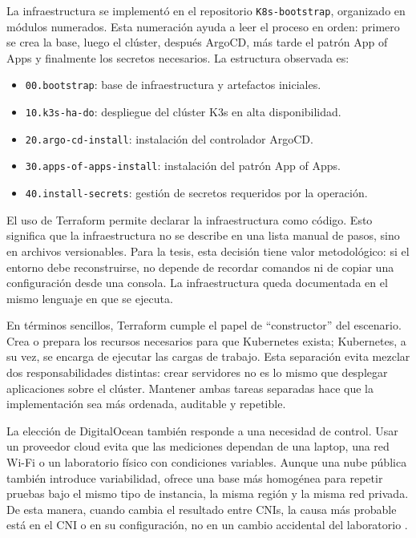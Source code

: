 \documentclass[journal]{IEEEtran}
\begin{document}
La infraestructura se implementó en el repositorio \texttt{K8s-bootstrap}, organizado en módulos numerados. Esta numeración ayuda a leer el proceso en orden: primero se crea la base, luego el clúster, después ArgoCD, más tarde el patrón App of Apps y finalmente los secretos necesarios. La estructura observada es:

\begin{itemize}
\item \texttt{00.bootstrap}: base de infraestructura y artefactos iniciales.
\item \texttt{10.k3s-ha-do}: despliegue del clúster K3s en alta disponibilidad.
\item \texttt{20.argo-cd-install}: instalación del controlador ArgoCD.
\item \texttt{30.apps-of-apps-install}: instalación del patrón App of Apps.
\item \texttt{40.install-secrets}: gestión de secretos requeridos por la operación.
\end{itemize}

El uso de Terraform permite declarar la infraestructura como código. Esto significa que la infraestructura no se describe en una lista manual de pasos, sino en archivos versionables. Para la tesis, esta decisión tiene valor metodológico: si el entorno debe reconstruirse, no depende de recordar comandos ni de copiar una configuración desde una consola. La infraestructura queda documentada en el mismo lenguaje en que se ejecuta.

En términos sencillos, Terraform cumple el papel de ``constructor'' del escenario. Crea o prepara los recursos necesarios para que Kubernetes exista; Kubernetes, a su vez, se encarga de ejecutar las cargas de trabajo. Esta separación evita mezclar dos responsabilidades distintas: crear servidores no es lo mismo que desplegar aplicaciones sobre el clúster. Mantener ambas tareas separadas hace que la implementación sea más ordenada, auditable y repetible.

La elección de DigitalOcean también responde a una necesidad de control. Usar un proveedor cloud evita que las mediciones dependan de una laptop, una red Wi-Fi o un laboratorio físico con condiciones variables. Aunque una nube pública también introduce variabilidad, ofrece una base más homogénea para repetir pruebas bajo el mismo tipo de instancia, la misma región y la misma red privada. De esta manera, cuando cambia el resultado entre CNIs, la causa más probable está en el CNI o en su configuración, no en un cambio accidental del laboratorio \cite{ref29}.
\end{document}

